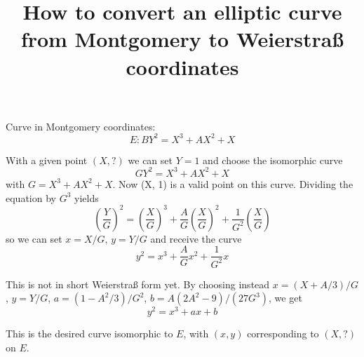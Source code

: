 \documentclass{article}
\begin{document}
\newcommand{\C}{{\bf C}}

\title{How to convert an elliptic curve from Montgomery to Weierstra\ss{} 
       coordinates}

\maketitle

Curve in Montgomery coordinates:
\begin{displaymath}
E: B Y^2 = X^3 + A X^2 + X
\end{displaymath}

With a given  point $(X, ?)$ we can set $Y=1$ and choose the isomorphic 
curve
%
\begin{displaymath}
G Y^2 = X^3 + A X^2 + X
\end{displaymath}
%
with $G = X^3 + A X^2 + X$. Now (X, 1) is a valid point on this curve.
Dividing the equation by $G^3$ yields
%
\begin{displaymath}
\left(\frac{Y}{G}\right)^2 = \left(\frac{X}{G}\right)^3 + 
                             \frac{A}{G} \left(\frac{X}{G}\right)^2 + 
                             \frac{1}{G^2} \left(\frac{X}{G}\right)
\end{displaymath}
%
so we can set $x = X/G$, $y = Y/G$ and receive the curve
\begin{displaymath}
y^2 = x^3 + \frac{A}{G} x^2 + \frac{1}{G^2} x
\end{displaymath}

This is not in short Weierstra\ss{} form yet. By choosing instead
$x = (X+A/3)/G$, $y = Y/G$, $a = (1-A^2/3)/G^2$, 
$b = A (2 A^2 - 9)/(27 G^3)$, we get
\begin{displaymath}
y^2 = x^3 + a x + b
\end{displaymath}

This is the desired curve isomorphic to $E$, with $(x,y)$ corresponding 
to $(X,?)$ on $E$.
\end{document}

